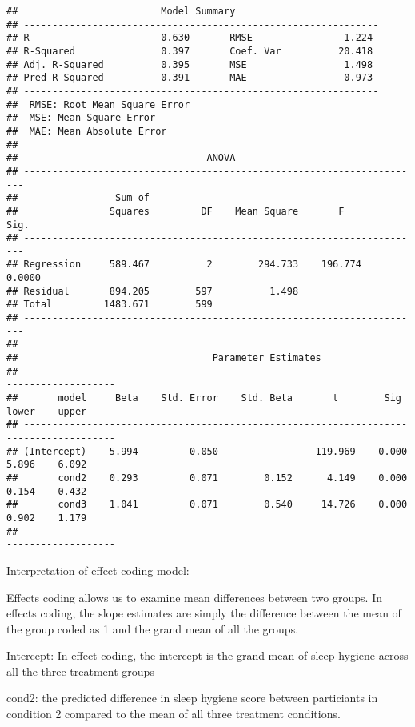 \documentclass[]{article}
\begin{document}
\begin{verbatim}
##                         Model Summary                          
## --------------------------------------------------------------
## R                       0.630       RMSE                1.224 
## R-Squared               0.397       Coef. Var          20.418 
## Adj. R-Squared          0.395       MSE                 1.498 
## Pred R-Squared          0.391       MAE                 0.973 
## --------------------------------------------------------------
##  RMSE: Root Mean Square Error 
##  MSE: Mean Square Error 
##  MAE: Mean Absolute Error 
## 
##                                 ANOVA                                  
## ----------------------------------------------------------------------
##                 Sum of                                                
##                Squares         DF    Mean Square       F         Sig. 
## ----------------------------------------------------------------------
## Regression     589.467          2        294.733    196.774    0.0000 
## Residual       894.205        597          1.498                      
## Total         1483.671        599                                     
## ----------------------------------------------------------------------
## 
##                                  Parameter Estimates                                   
## --------------------------------------------------------------------------------------
##       model     Beta    Std. Error    Std. Beta       t        Sig     lower    upper 
## --------------------------------------------------------------------------------------
## (Intercept)    5.994         0.050                 119.969    0.000    5.896    6.092 
##       cond2    0.293         0.071        0.152      4.149    0.000    0.154    0.432 
##       cond3    1.041         0.071        0.540     14.726    0.000    0.902    1.179 
## --------------------------------------------------------------------------------------
\end{verbatim}

Interpretation of effect coding model:

Effects coding allows us to examine mean differences between two groups.
In effects coding, the slope estimates are simply the difference between
the mean of the group coded as 1 and the grand mean of all the groups.

Intercept: In effect coding, the intercept is the grand mean of sleep
hygiene across all the three treatment groups

cond2: the predicted difference in sleep hygiene score between
particiants in condition 2 compared to the mean of all three treatment
conditions.
\end{document}
